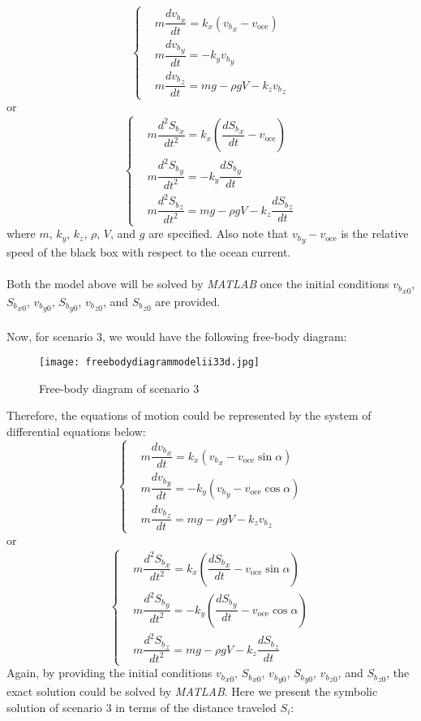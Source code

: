 \documentclass[a4paper,11pt]{article}
\begin{document}
\begin{spacing}{1.0}
\[
\left\{
\begin{aligned}
& m\dfrac{d{v_b}_x}{dt} = k_x({v_b}_x - v_\text{oce})
\\& m\dfrac{d{v_b}_y}{dt} = - k_y{v_b}_{y}
\\& m\dfrac{d{v_b}_z}{dt} = mg - \rho g V - k_z {v_b}_z
\end{aligned}
\right.
\]
or
\[
\left\{
\begin{aligned}
& m\dfrac{d^2{S_b}_x}{dt^2} = k_x(\dfrac{d{S_b}_x}{dt} - v_\text{oce})
\\& m\dfrac{d^2{S_b}_y}{dt^2} = -k_y\dfrac{d{S_b}_y}{dt}
\\& m\dfrac{d^2{S_b}_z}{dt^2} = mg - \rho g V - k_z \dfrac{d{S_b}_z}{dt}
\end{aligned}
\right.
\]
where $m$, $k_y$, $k_z$, $\rho$, $V$, and $g$ are specified. Also note that ${v_b}_y - v_\text{oce}$ is the relative speed of the black box with respect to the ocean current.
\\~
\\Both the model above will be solved by \textit{MATLAB} once the initial conditions ${v_b}_{x0}$, ${S_b}_{x0}$, ${v_b}_{y0}$, ${S_b}_{y0}$, ${v_b}_{z0}$, and ${S_b}_{z0}$ are provided.
\\~
\\Now, for scenario 3, we would have the following free-body diagram:
\begin{figure}[H]
	\centering
	\texttt{[image: freebodydiagrammodelii33d.jpg]}
	\caption{Free-body diagram of scenario 3}
\end{figure}
\noindent Therefore, the equations of motion could be represented by the system of differential equations below: 
\[
\left\{
\begin{aligned}
& m\dfrac{d{v_b}_x}{dt} = k_x({v_b}_x - v_\text{oce}\sin\alpha)
\\& m\dfrac{d{v_b}_y}{dt} = -k_y({v_b}_y - v_\text{oce}\cos\alpha)
\\& m\dfrac{d{v_b}_z}{dt} = mg - \rho g V - k_z {v_b}_z
\end{aligned}
\right.
\]
or
\[
\left\{
\begin{aligned}
& m\dfrac{d^2{S_b}_x}{dt^2} = k_x(\dfrac{d{S_b}_x}{dt} - v_\text{oce}\sin\alpha)
\\& m\dfrac{d^2{S_b}_y}{dt^2} = -k_y(\dfrac{d{S_b}_y}{dt} - v_\text{oce}\cos\alpha)
\\& m\dfrac{d^2{S_b}_z}{dt^2} = mg - \rho g V - k_z \dfrac{d{S_b}_z}{dt}
\end{aligned}
\right.
\]
Again, by providing the initial conditions ${v_b}_{x0}$, ${S_b}_{x0}$, ${v_b}_{y0}$, ${S_b}_{y0}$, ${v_b}_{z0}$, and ${S_b}_{z0}$, the exact solution could be solved by \textit{MATLAB}. Here we present the symbolic solution of scenario 3 in terms of the distance traveled $S_i$:

\end{spacing}
\end{document}

